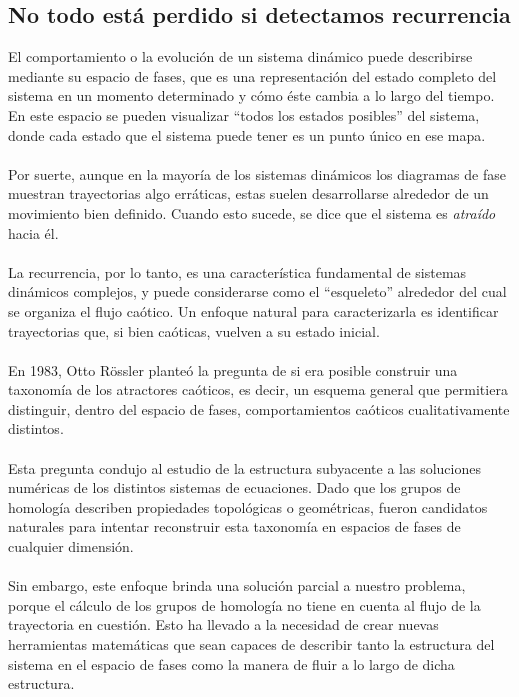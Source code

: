 \documentclass[12pt,a4paper]{article}
\begin{document}
\subsection{No todo está perdido si detectamos recurrencia}
El comportamiento o la evolución de un sistema dinámico puede describirse mediante su espacio de fases, que es una representación del estado completo del sistema en un momento determinado y cómo éste cambia a lo largo del tiempo. En este espacio se pueden visualizar ``todos los estados posibles'' del sistema, donde cada estado que el sistema puede tener es un punto único en ese mapa.
\\
\\
Por suerte, aunque en la mayoría de los sistemas dinámicos los diagramas de fase muestran trayectorias algo erráticas, estas suelen desarrollarse alrededor de un movimiento bien definido. Cuando esto sucede, se dice que el sistema es \textit{atraído} hacia él.
\\
\\
La recurrencia, por lo tanto, es una característica fundamental de sistemas dinámicos complejos, y puede considerarse como el ``esqueleto'' alrededor del cual se organiza el flujo caótico. Un enfoque natural para caracterizarla es identificar trayectorias que, si bien caóticas, vuelven a su estado inicial.
\\
\\
En 1983, Otto Rössler planteó la pregunta de si era posible construir una taxonomía de los atractores caóticos, es decir, un esquema general que permitiera distinguir, dentro del espacio de fases, comportamientos caóticos cualitativamente distintos.
\\
\\
Esta pregunta condujo al estudio de la estructura subyacente a las soluciones numéricas de los distintos sistemas de ecuaciones. Dado que los grupos de homología describen propiedades topológicas o geométricas, fueron candidatos naturales para intentar reconstruir esta taxonomía en espacios de fases de cualquier dimensión.
\\
\\
Sin embargo, este enfoque brinda una solución parcial a nuestro problema, porque el cálculo de los grupos de homología no tiene en cuenta al flujo de la trayectoria en cuestión. Esto ha llevado a la necesidad de crear nuevas herramientas matemáticas que sean capaces de describir tanto la estructura del sistema en el espacio de fases como la manera de fluir a lo largo de dicha estructura.
\\
\end{document}
